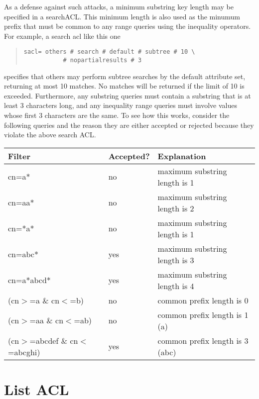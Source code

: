 As a defense against such attacks, a minimum substring key length may
be specified in a searchACL.  This minimum length is also used as the
minumum prefix that must be common to any range queries using the inequality
operators.  For example, a search acl like this one

\begin{quote}\small\begin{verbatim}
sacl= others # search # default # subtree # 10 \ 
           # nopartialresults # 3
\end{verbatim}\end{quote}
  
specifies that others may perform subtree searches by the default
attribute set, returning at most 10 matches.  No matches will be
returned if the limit of 10 is exceeded.  Furthermore, any substring
queries must contain a substring that is at least 3 characters long,
and any inequality range queries must involve values whose first 3
characters are the same.  To see how this works, consider the following
queries and the reason they are either accepted or rejected because
they violate the above search ACL.

\begin{tabular}{lll}
Filter              &       Accepted? & Explanation \\\hline
cn=a*               &       no        & maximum substring length is 1\\
cn=aa*              &       no        & maximum substring length is 2\\
cn=*a*              &       no        & maximum substring length is 1\\
cn=abc*             &       yes       & maximum substring length is 3\\
cn=a*abcd*          &       yes       & maximum substring length is 4\\
(cn$>$=a \& cn$<$=b)     &       no        & common prefix length is 0\\
(cn$>$=aa \& cn$<$=ab)   &       no        & common prefix length is 1 (a)\\
(cn$>$=abcdef \& cn$<$=abcghi) & yes       & common prefix length is 3 (abc)\\
\end{tabular}

\section{List ACL}
\label{disc_lacl}


